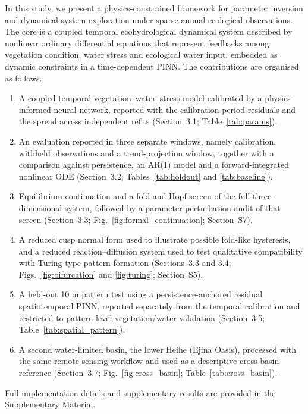 \documentclass[preprint,review,12pt,3p]{elsarticle}
\begin{document}
	In this study, we present a physics-constrained framework for parameter inversion and dynamical-system exploration under sparse annual ecological observations. The core is a coupled temporal ecohydrological dynamical system described by nonlinear ordinary differential equations that represent feedbacks among vegetation condition, water stress and ecological water input, embedded as dynamic constraints in a time-dependent PINN. The contributions are organised as follows.

\begin{enumerate}
	\item A coupled temporal vegetation--water--stress model calibrated by a physics-informed neural network, reported with the calibration-period residuals and the spread across independent refits (Section~3.1; Table~\ref{tab:params}).
	\item An evaluation reported in three separate windows, namely calibration, withheld observations and a trend-projection window, together with a comparison against persistence, an AR(1) model and a forward-integrated nonlinear ODE (Section~3.2; Tables~\ref{tab:holdout} and \ref{tab:baseline}).
	\item Equilibrium continuation and a fold and Hopf screen of the full three-dimensional system, followed by a parameter-perturbation audit of that screen (Section~3.3; Fig.~\ref{fig:formal_continuation}; Section~S7).
	\item A reduced cusp normal form used to illustrate possible fold-like hysteresis, and a reduced reaction--diffusion system used to test qualitative compatibility with Turing-type pattern formation (Sections~3.3 and 3.4; Figs.~\ref{fig:bifurcation} and \ref{fig:turing}; Section~S5).
	\item A held-out 10 m pattern test using a persistence-anchored residual spatiotemporal PINN, reported separately from the temporal calibration and restricted to pattern-level vegetation/water validation (Section~3.5; Table~\ref{tab:spatial_pattern}).
	\item A second water-limited basin, the lower Heihe (Ejina Oasis), processed with the same remote-sensing workflow and used as a descriptive cross-basin reference (Section~3.7; Fig.~\ref{fig:cross_basin}; Table~\ref{tab:cross_basin}).
\end{enumerate}

Full implementation details and supplementary results are provided in the Supplementary Material.
	
\end{document}
